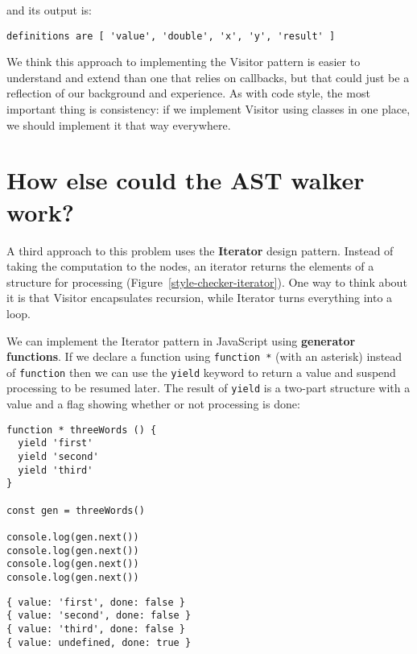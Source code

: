 \documentclass[krantzl]{krantz}
\newcommand{\figref}[1]{Figure~\ref{#1}}
\newcommand{\glossref}[1]{\textbf{#1}}
\begin{document}
\noindent and its output is:


\begin{lstlisting}[frame=tblr,backgroundcolor=\color{black!5}]
definitions are [ 'value', 'double', 'x', 'y', 'result' ]
\end{lstlisting}



We think this approach to implementing the Visitor pattern is easier to understand and extend
than one that relies on callbacks,
but that could just be a reflection of our background and experience.
As with code style,
the most important thing is consistency:
if we implement Visitor using classes in one place,
we should implement it that way everywhere.

\section{How else could the AST walker work?}\label{style-checker-alternatives}


A third approach to this problem uses
the \glossref{Iterator} design pattern.
Instead of taking the computation to the nodes,
an iterator returns the elements of a structure for processing
(\figref{style-checker-iterator}).
One way to think about it is that Visitor encapsulates recursion,
while Iterator turns everything into a loop.


We can implement the Iterator pattern in JavaScript using
\glossref{generator functions}.
If we declare a function using \texttt{function *} (with an asterisk) instead of \texttt{function}
then we can use the \texttt{yield} keyword to return a value and suspend processing to be resumed later.
The result of \texttt{yield} is a two-part structure with a value and a flag showing whether or not processing is done:


\begin{lstlisting}[frame=tblr]
function * threeWords () {
  yield 'first'
  yield 'second'
  yield 'third'
}

const gen = threeWords()

console.log(gen.next())
console.log(gen.next())
console.log(gen.next())
console.log(gen.next())
\end{lstlisting}



\begin{lstlisting}[frame=tblr,backgroundcolor=\color{black!5}]
{ value: 'first', done: false }
{ value: 'second', done: false }
{ value: 'third', done: false }
{ value: undefined, done: true }
\end{lstlisting}
\end{document}
